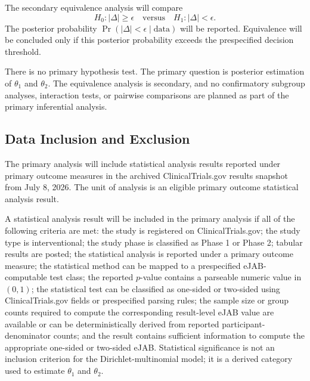 \documentclass[11pt]{article}
\begin{document}
The secondary equivalence analysis will compare
\[
H_0: |\Delta| \geq \epsilon
\quad \text{versus} \quad
H_1: |\Delta| < \epsilon.
\]
The posterior probability \(\Pr(|\Delta|<\epsilon \mid \text{data})\) will be reported. Equivalence will be concluded only if this posterior probability exceeds the prespecified decision threshold.

There is no primary hypothesis test. The primary question is posterior estimation of \(\theta_1\) and \(\theta_2\). The equivalence analysis is secondary, and no confirmatory subgroup analyses, interaction tests, or pairwise comparisons are planned as part of the primary inferential analysis.

\subsection{Data Inclusion and Exclusion}

The primary analysis will include statistical analysis results reported under primary outcome measures in the archived ClinicalTrials.gov results snapshot from July 8, 2026. The unit of analysis is an eligible primary outcome statistical analysis result.

A statistical analysis result will be included in the primary analysis if all of the following criteria are met: the study is registered on ClinicalTrials.gov; the study type is interventional; the study phase is classified as Phase 1 or Phase 2; tabular results are posted; the statistical analysis is reported under a primary outcome measure; the statistical method can be mapped to a prespecified eJAB-computable test class; the reported \(p\)-value contains a parseable numeric value in \((0,1)\); the statistical test can be classified as one-sided or two-sided using ClinicalTrials.gov fields or prespecified parsing rules; the sample size or group counts required to compute the corresponding result-level eJAB value are available or can be deterministically derived from reported participant-denominator counts; and the result contains sufficient information to compute the appropriate one-sided or two-sided eJAB. Statistical significance is not an inclusion criterion for the Dirichlet-multinomial model; it is a derived category used to estimate \(\theta_1\) and \(\theta_2\).
\end{document}
